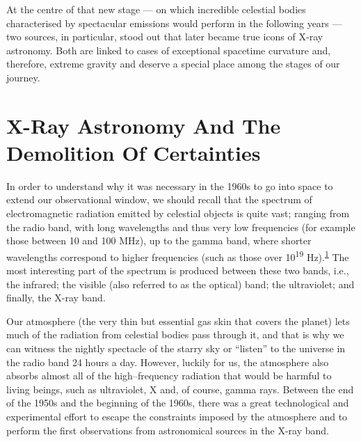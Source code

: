 At the centre of that new stage --- on which incredible celestial bodies characterised
by spectacular emissions would perform in the following years --- two sources, in
particular, stood out that later became true icons of X-ray
astronomy. Both are linked to cases of exceptional spacetime curvature and, therefore,
extreme gravity and deserve a special place among the stages of our journey.

\section{X-Ray Astronomy And The Demolition Of Certainties}\label{sec:05-xray}

In order to understand why it was necessary in the 1960s to go into
space to extend our observational window, we should recall that the spectrum of
electromagnetic radiation emitted by celestial objects is quite vast;
ranging from the radio band, with long wavelengths and thus very low frequencies (for
example those between 10 and 100 MHz), up to the gamma band, where shorter wavelengths
correspond to higher frequencies (such as those over 10\textsuperscript{19}
Hz).\textsuperscript{\hyperlink{note:05-01}{1}} The most interesting part of the spectrum is
produced between these two bands, i.e., the infrared; the visible (also referred to as
the optical) band; the ultraviolet; and finally, the X-ray band.

Our atmosphere (the very thin but essential gas skin that covers the planet) lets much
of the radiation from celestial bodies pass through it, and that is why we can witness
the nightly spectacle of the starry sky or ``listen'' to the universe in the radio band
24 hours a day. However, luckily for us, the atmosphere also absorbs almost all of the
high--frequency radiation that would be harmful to living beings, such as ultraviolet, X
and, of course, gamma rays. Between the end of the 1950s and the beginning of the 1960s,
there was a great technological and experimental effort to escape the constraints
imposed by the atmosphere and to perform the first observations from astronomical
sources in the X-ray band.

